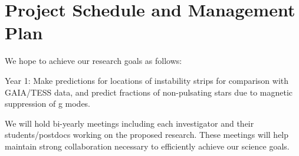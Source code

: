 \section{Project Schedule and Management Plan}

We hope to achieve our research goals as follows:

Year 1: Make predictions for locations of instability strips for comparison with GAIA/TESS data, and predict fractions of non-pulsating stars due to magnetic suppression of g modes. 

We will  hold bi-yearly meetings including each investigator and their students/postdocs working on the proposed research. These meetings will help maintain strong collaboration necessary to efficiently achieve our science goals.
